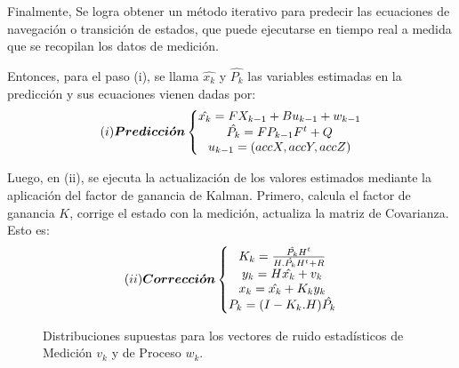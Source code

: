 Finalmente, Se logra obtener un método iterativo para predecir las ecuaciones de navegación o transición de estados, que puede ejecutarse en tiempo real a medida que se recopilan los datos de medición.

\noindent Entonces, para el paso (i), se llama $\hat{x_{k}}$ y $\hat{P_k}$ las variables estimadas en la predicción y sus ecuaciones vienen dadas por:
\[ (i) \boldsymbol{Predicci\Acute{o}n}\left\{ 
            \begin{matrix}
            \hat{x_{k}} = F X_{k-1} + B u_{k-1} + w_{k-1} \\
            \hat{P_k} = FP_{k-1}F^t + Q\\
             u_{k-1}=(accX,accY,accZ)
            \end{matrix}
\right. \]

\noindent Luego, en (ii), se ejecuta la actualización de los valores estimados mediante la aplicación del factor de ganancia de Kalman. Primero, calcula el factor de ganancia $K$, corrige el estado con la medición, actualiza la matriz de Covarianza. Esto es:
\[ (ii) \boldsymbol{Correcci\Acute{o}n}\left\{ 
            \begin{matrix}
            K_k = \frac{\hat{P_k}H^t}{H.\hat{P_k}H^t + R}\\
            y_k = H\hat{x_{k}} +v_k\\
            x_{k} =  \hat{x_{k}} + K_k y_k\\
            P_k = (I -K_k.H)\hat{P_k}
            \end{matrix}
\right. \]

\begin{figure}[H]
    \centering
    \captionsetup{justification=centering}
    \caption{Distribuciones supuestas para los vectores de ruido estadísticos de Medición $v_k$ y de Proceso $w_k$.}
    \label{FIG: madgwick}
\end{figure}

